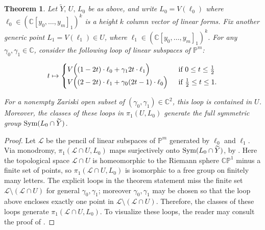 \documentclass[letter]{amsart}
\newtheorem{theorem}[prop]{Theorem}
\theoremstyle{definition}
\begin{document}
\begin{theorem} \label{thm:monodromy}
Let $\widetilde{Y}, \, U, \, L_{0}$ be as above, and write $L_{0} = V(\ell_{0})$
where $\ell_{0} \in ({\mathbb{C}}[y_0, \ldots, y_m]_{1})^k$ is a height $k$ column vector of linear forms.
Fix another generic point $L_{1} = V(\ell_{1}) \in U$, where $\ell_{1} \in ({\mathbb{C}}[y_0, \ldots, y_m]_{1})^k$.
For any $\gamma_0, \gamma_1 \in {\mathbb{C}}$, consider the following loop of linear subspaces of ${\mathbb{P}}^{m}$\textup{:}

\vspace{-0.5em}

$$ t \mapsto \begin{cases}
      V\Big{(}(1-2t)\cdot \ell_0 + \gamma_1 2t \cdot \ell_{1} \Big{)}  & \,\,\, \textup{if}\ 0 \leq t \leq \frac{1}{2} \\
      V\Big{(}(2-2t)\cdot \ell_{1} + \gamma_0 (2t-1) \cdot \ell_{0}\Big{)}  & \,\,\, \textup{if}\ \frac{1}{2} \leq t \leq 1.
    \end{cases}$$

\noindent For a nonempty Zariski open subset of $(\gamma_0, \gamma_1) \in {\mathbb{C}}^{2}$, this loop is
contained in $U$.  Moreover, the classes of these loops in $\pi_{1}(U, L_{0})$ generate the full
symmetric group $\textup{Sym}(L_{0} \cap \widetilde{Y})$.
\end{theorem}

\begin{proof}
Let $\mathcal{L}$ be the pencil of linear subspaces of ${\mathbb{P}}^m$ generated by $\ell_0$ and $\ell_1$.
Via monodromy, $\pi_1(\mathcal{L} \cap U, L_0)$ maps surjectively onto $\textup{Sym}(L_{0} \cap \widetilde{Y})$,
by \cite[Corollary 3.5]{SVW}.  Here the topological space $\mathcal{L} \cap U$ is homeomorphic 
to the Riemann sphere ${\mathbb{C}}{\mathbb{P}}^1$ minus a finite set of points, so $\pi_1(\mathcal{L} \cap U, L_0)$  
is isomorphic to a free group on finitely many letters.  The explicit loops in the theorem 
statement miss the finite set $\mathcal{L} \setminus (\mathcal{L} \cap U)$ for general $\gamma_0, \gamma_1$; moreover $\gamma_0, \gamma_1$
may be chosen so that the loop above encloses exactly one point in $\mathcal{L} \setminus (\mathcal{L} \cap U)$.
Therefore, the classes of these loops generate $\pi_1(\mathcal{L} \cap U, L_0)$.
To visualize these loops, the reader may consult the proof of \cite[Lemma 7.1.3]{SW}.
\end{proof}
\end{document}
